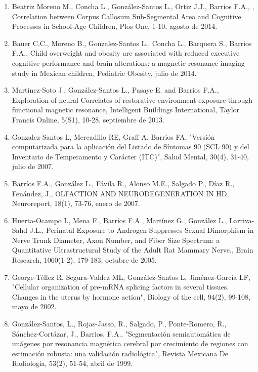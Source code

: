 \begin{enumerate}
\item Beatriz Moreno M., Concha L., González-Santos L., Ortiz J.J., Barrios F.A., , Correlation between Corpus Callosum 
Sub-Segmental Area and Cognitive Processes in School-Age Children, Plos One, 1-10, agosto de 2014.

\item Bauer C.C., Moreno B., Gonzalez-Santos L., Concha L., Barquera S., Barrios F.A., Child overweight and obesity are 
associated with reduced executive cognitive performance and brain alterations: a magnetic resonance imaging study in 
Mexican children, Pediatric Obesity, julio de 2014.

\item Martínez-Soto J., González-Santos L., Pasaye E. and Barrios F.A., Exploration of neural Correlates of restorative 
environment exposure through functional magnetic resonance, Intelligent Buildings International, Taylor Francis Online, 5(S1), 10-28, septiembre de 2013.

\item Gonzalez-Santos L, Mercadillo RE, Graff A, Barrios FA, "Versión computarizada para la aplicación del Listado de 
Síntomas 90 (SCL 90) y del Inventario de Temperamento y Carácter (ITC)", Salud Mental, 30(4), 31-40, julio de 2007.

\item Barríos F.A., González L., Fávila R., Alonso M.E., Salgado P., Díaz R., Fenández, J., OLFACTION AND NEURODEGENERATION 
IN HD, Neuroreport, 18(1), 73-76, enero de 2007.

\item Huerta-Ocampo I., Mena F., Barríos F.A., Martínez G., González L., Larriva-Sahd J.L., Perinatal Exposure to Androgen 
Suppresses Sexual Dimorphism in Nerve Trunk Diameter, Axon Number, and Fiber Size Spectrum: a Quantitative Ultrastructural 
Study of the Adult Rat Mammary Nerve., Brain Research, 1060(1-2), 179-183, octubre de 2005.

\item George-Téllez R, Segura-Valdez ML, González-Santos L, Jiménez-García LF, "Cellular organization of pre-mRNA splicing 
factors in several tissues. Changes in the uterus by hormone action", Biology of the cell, 94(2), 99-108, mayo de 2002.

\item González-Santos, L., Rojas-Jasso, R., Salgado, P., Ponte-Romero, R., Sánchez-Cortázar, J., Barrios, F.A., "Segmentación 
semiautomática de imágenes por resonancia magnética cerebral por crecimiento de regiones con estimación robusta: una 
validación radiológica", Revista Mexicana De Radiologia, 53(2), 51-54, abril de 1999.

\end{enumerate}
